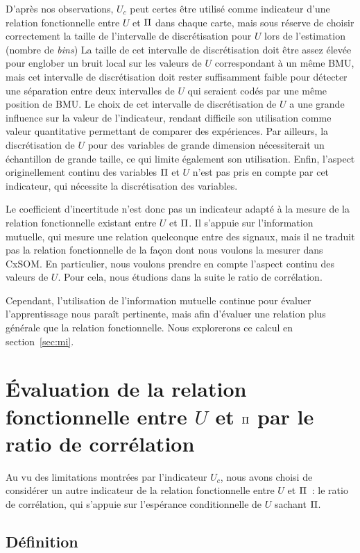 \documentclass[../main]{subfiles}
\begin{document}
D'après nos observations, $U_c$ peut certes être utilisé comme indicateur d'une relation fonctionnelle entre $U$ et $\Pi$ dans chaque carte, mais sous réserve de choisir correctement la taille de l'intervalle de discrétisation pour $U$ lors de l'estimation (nombre de \emph{bins})
La taille de cet intervalle de discrétisation doit être assez élevée pour englober un bruit local sur les valeurs de $U$ correspondant à un même BMU, mais cet intervalle de discrétisation doit rester suffisamment faible pour détecter une séparation entre deux intervalles de $U$ qui seraient codés par une même position de BMU.
Le choix de cet intervalle de discrétisation de $U$ a une grande influence sur la valeur de l'indicateur, rendant difficile son utilisation comme valeur quantitative permettant de comparer des expériences.
Par ailleurs, la discrétisation de $U$ pour des variables de grande dimension nécessiterait un échantillon de grande taille, ce qui limite également son utilisation.
Enfin, l'aspect originellement continu des variables $\Pi$ et $U$ n'est pas pris en compte par cet indicateur, qui nécessite la discrétisation des variables.

Le coefficient d'incertitude n'est donc pas un indicateur adapté à la mesure de la relation fonctionnelle existant entre $U$ et $\Pi$. Il s'appuie sur l'information mutuelle, qui mesure une relation quelconque entre des signaux, mais il ne traduit pas la relation fonctionnelle de la façon dont nous voulons la mesurer dans CxSOM. En particulier, nous voulons prendre en compte l'aspect continu des valeurs de $U$. Pour cela, nous étudions dans la suite le ratio de corrélation.

Cependant, l'utilisation de l'information mutuelle continue pour évaluer l'apprentissage nous paraît pertinente, mais afin d'évaluer une relation plus générale que la relation fonctionnelle.
Nous explorerons ce calcul en section~\ref{sec:mi}.

\section{\'Evaluation de la relation fonctionnelle entre $U$ et $\Pi$ par le ratio de corrélation}

Au vu des limitations montrées par l'indicateur $U_c$, nous avons choisi de considérer un autre indicateur de la relation fonctionnelle entre $U$ et $\Pi$~: le ratio de corrélation, qui s'appuie sur l'espérance conditionnelle de $U$ sachant $\Pi$.

\subsection{Définition}
\end{document}
